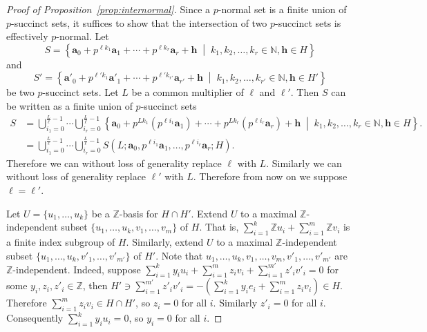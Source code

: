 \documentclass[letterpaper, 11pt, thm-restate]{article}
\numberwithin{equation}{section}
\newcommand{\Z}{\mathbb{Z}}
\newcommand{\N}{\mathbb{N}}
\newcommand{\ba}{\boldsymbol{a}}
\newcommand{\bh}{\boldsymbol{h}}
\theoremstyle{definition}
\theoremstyle{definition}
\theoremstyle{definition}
\begin{document}
\begin{proof}[Proof of Proposition~\ref{prop:internormal}]
    Since a $p$-normal set is a finite union of $p$-succinct sets, it suffices to show that the intersection of two $p$-succinct sets is effectively $p$-normal.
    Let
    \[
    S = \left\{\ba_0 + p^{\ell k_1} \ba_1 + \cdots + p^{\ell k_r} \ba_r + \bh \;\middle|\; k_1, k_2, \ldots, k_r \in \N, \bh \in H \right\}
    \]
    and
    \[
    S' = \left\{\ba'_0 + p^{\ell' k_1} \ba'_1 + \cdots + p^{\ell' k_{r'}} \ba_{r'} + \bh \;\middle|\; k_1, k_2, \ldots, k_{r'} \in \N, \bh \in H' \right\}
    \]
    be two $p$-succinct sets.
    Let $L$ be a common multiplier of $\ell$ and $\ell'$.
    Then $S$ can be written as a finite union of $p$-succinct sets
    \begin{align*}
    S & = \bigcup_{i_1 = 0}^{\frac{L}{\ell} - 1} \cdots \bigcup_{i_r = 0}^{\frac{L}{\ell} - 1}
    \left\{ \ba_0 + p^{L k_1} (p^{\ell i_1}\ba_1) + \cdots + p^{L k_r} (p^{\ell i_r}\ba_r) + \bh \;\middle|\; k_1, k_2, \ldots, k_r \in \N, \bh \in H \right\}. \\
    & = \bigcup_{i_1 = 0}^{\frac{L}{\ell} - 1} \cdots \bigcup_{i_r = 0}^{\frac{L}{\ell} - 1} S\left(L; \ba_0, p^{\ell i_1}\ba_1, \ldots, p^{\ell i_r}\ba_r ; H \right).
    \end{align*}
    Therefore we can without loss of generality replace $\ell$ with $L$.
    Similarly we can without loss of generality replace $\ell'$ with $L$.
    Therefore from now on we suppose $\ell = \ell'$.
    
    Let $U = \{u_1, \ldots, u_k\}$ be a $\Z$-basis for $H \cap H'$. Extend $U$ to a maximal $\Z$-independent subset $\{u_1, \ldots, u_k, v_1, \ldots, v_m\}$ of $H$. That is, $\sum_{i = 1}^k \Z u_i + \sum_{i = 1}^m \Z v_i$ is a finite index subgroup of $H$.
    Similarly, extend $U$ to a maximal $\Z$-independent subset $\{u_1, \ldots, u_k, v'_1, \ldots, v'_{m'}\}$ of $H'$.
    Note that $u_1, \ldots, u_k, v_1, \ldots, v_m, v'_1, \ldots, v'_{m'}$ are $\Z$-independent. Indeed, suppose $\sum_{i = 1}^k y_i u_i + \sum_{i = 1}^m z_i v_i + \sum_{i = 1}^{m'} z'_i v'_i = 0$ for some $y_i, z_i, z'_i \in \Z$, then $H' \ni \sum_{i = 1}^{m'} z'_i v'_i = - (\sum_{i = 1}^k y_i e_i + \sum_{i = 1}^m z_i v_i) \in H$.
    Therefore $\sum_{i = 1}^m z_i v_i \in H \cap H'$, so $z_i = 0$ for all $i$. Similarly $z'_i = 0$ for all $i$. Consequently $\sum_{i = 1}^k y_i u_i = 0$, so $y_i = 0$ for all $i$.


\end{proof}
\end{document}
